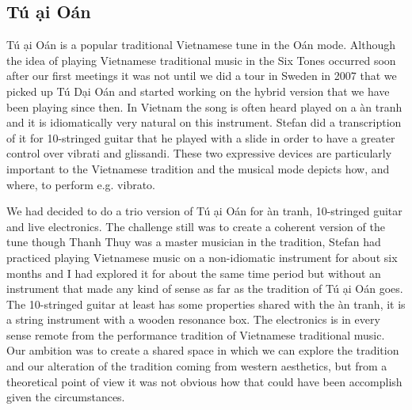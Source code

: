 \documentclass[a4paper]{article}
\begin{document}

\subsection*{T\'{u} \DH \d{a}i O\'{a}n}
\label{sec:tu-ddai-oan}

T\'{u} \DH \d{a}i O\'{a}n is a popular traditional Vietnamese tune in the O\'{a}n mode. Although the idea of playing Vietnamese traditional music in the Six Tones occurred soon after our first meetings it was not until we did a tour in Sweden in 2007 that we picked up T\'{u} D\d{a}i O\'{a}n and started working on the hybrid version that we have been playing since then. In Vietnam the song is often heard played on a \DH \`{a}n tranh and it is idiomatically very natural on this instrument. Stefan did a transcription of it for 10-stringed guitar that he played with a slide in order to have a greater control over vibrati and glissandi. These two expressive devices are particularly important to the Vietnamese tradition and the musical mode depicts how, and where, to perform e.g. vibrato.

We had decided to do a trio version of T\'{u} \DH \d{a}i O\'{a}n for \DH \`{a}n tranh, 10-stringed guitar and live electronics. The challenge still was to create a coherent version of the tune though Thanh Thuy was a master musician in the tradition, Stefan had practiced playing Vietnamese music on a non-idiomatic instrument for about six months and I had explored it for about the same time period but without an instrument that made any kind of sense as far as the tradition of  T\'{u} \DH \d{a}i O\'{a}n goes. The 10-stringed guitar at least has some properties shared with the \DH \`{a}n tranh, it is a string instrument with a wooden resonance box. The electronics is in every sense remote from the performance tradition of Vietnamese traditional music. Our ambition was to create a shared space in which we can explore the tradition and our alteration of the tradition coming from western aesthetics, but from a theoretical point of view it was not obvious how that could have been accomplish given the circumstances.
\end{document}
